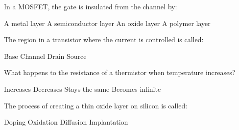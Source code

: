 \begin{question}[2]
In a MOSFET, the gate is insulated from the channel by:
\begin{oneparcheckboxes}
\choice A metal layer
\choice A semiconductor layer
\correctchoice An oxide layer
\choice A polymer layer
\end{oneparcheckboxes}
\end{question}

\begin{question}[2]
The region in a transistor where the current is controlled is called:
\begin{oneparcheckboxes}
\choice Base
\correctchoice Channel
\choice Drain
\choice Source
\end{oneparcheckboxes}
\end{question}

\begin{question}[2]
What happens to the resistance of a thermistor when temperature increases?
\begin{oneparcheckboxes}
\choice Increases
\correctchoice Decreases
\choice Stays the same
\choice Becomes infinite
\end{oneparcheckboxes}
\end{question}

\begin{question}[2]
The process of creating a thin oxide layer on silicon is called:
\begin{oneparcheckboxes}
\choice Doping
\correctchoice Oxidation
\choice Diffusion
\choice Implantation
\end{oneparcheckboxes}
\end{question} 